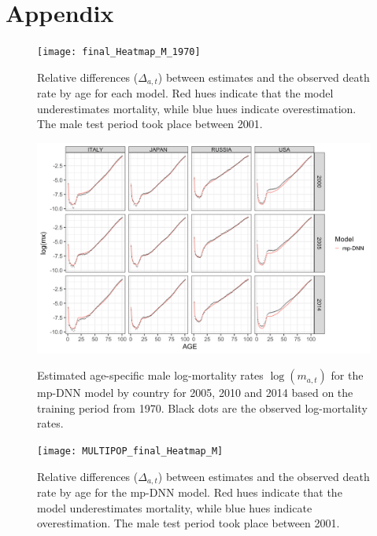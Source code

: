 \documentclass[a4,11pt]{article}
\begin{document}



\processdelayedfloats


\appendix
\section{Appendix}
\label{appendix:a}
\setcounter{figure}{0}

\begin{figure}[H]
	\centering
	\texttt{[image: final\_Heatmap\_M\_1970]}\\
	 \caption{Relative differences ($\Delta_{a,t}$) between estimates and the observed death rate by age for each model. Red hues indicate that the model underestimates mortality, while blue hues indicate overestimation. The male test period took place between 2001.}
	 \label{fig:relative.diff.MALE}
\end{figure}

\begin{figure}[H]
	\centering
	\includegraphics[width=1\linewidth]{MP_age_pattern_M_1970}\\
	 \caption{Estimated age-specific male log-mortality rates $\log(m_{a,t})$ for the mp-DNN model by country for 2005, 2010 and 2014 based on the training period from 1970. Black dots are the observed log-mortality rates.} 
	 \label{fig:MP.estimate.age.mx_M}
\end{figure}

\begin{figure}[H]
	\centering
	\texttt{[image: MULTIPOP\_final\_Heatmap\_M]}\\
	 \caption{Relative differences ($\Delta_{a,t}$) between estimates and the observed death rate by age for the mp-DNN model. Red hues indicate that the model underestimates mortality, while blue hues indicate overestimation. The male test period took place between 2001.}
	 \label{fig:MP.relative.diff.MALE}
\end{figure}
\end{document}
